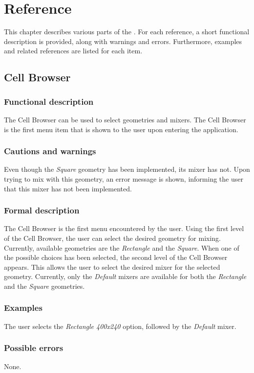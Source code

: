 \chapter{Reference}
This chapter describes various parts of the \applicationname{}. For each reference, a short functional description is provided, along with warnings and errors. Furthermore, examples and related references are listed for each item.

\section{Cell Browser}
\label{sec:cellBrows}
  \subsection*{Functional description}
  The Cell Browser can be used to select geometries and mixers. The Cell Browser is the first menu item that is shown to the user upon entering the application.
 
  \subsection*{Cautions and warnings}
  Even though the \emph{Square} geometry has been implemented, its mixer has not. Upon trying to mix with this geometry, an error message is shown, informing the user that this mixer has not been implemented.

  \subsection*{Formal description}
  The Cell Browser is the first menu encountered by the user. Using the first level of the Cell Browser, the user can select the desired geometry for mixing. Currently, available geometries are the \emph{Rectangle} and the \emph{Square}. When one of the possible choices has been selected, the second level of the Cell Browser appears. This allows the user to select the desired mixer for the selected geometry. Currently, only the \emph{Default} mixers are available for both the \emph{Rectangle} and the \emph{Square} geometries.
  
  \subsection*{Examples}
  The user selects the \emph{Rectangle 400x240} option, followed by the \emph{Default} mixer.

  \subsection*{Possible errors}
  None.

